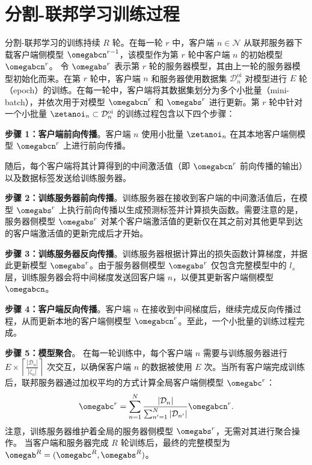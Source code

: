 \section{分割-联邦学习训练过程}\label{subsec:training}
分割-联邦学习的训练持续 $R$ 轮。在每一轮 $r$ 中，客户端 $n \in \mathcal{N}$ 从联邦服务器下载客户端侧模型 $\omegabcn^{r-1}$，该模型作为第 $r$ 轮中客户端 $n$ 的初始模型 $\omegabcn^{r}$。  
令 $\omegabs^{r}$ 表示第 $r$ 轮的服务器模型，其由上一轮的服务器模型初始化而来。在第 $r$ 轮中，客户端 $n$ 和服务器使用数据集 $\mathcal{D}_{n}^{\text{oi}}$ 对模型进行 $E$ 轮（epoch）的训练。在每一轮中，客户端将其数据集划分为多个小批量（mini-batch），并依次用于对模型 $\omegabcn^{r}$ 和 $\omegabs^r$ 进行更新。第 $r$ 轮中针对一个小批量 $\zetanoi_n \subset \mathcal{D}_{n}^{\text{oi}}$ 的训练过程包含以下四个步骤：

\textbf{步骤 1：客户端前向传播}。客户端 $n$ 使用小批量 $\zetanoi_n$ 在其本地客户端侧模型 $\omegabcn^{r}$ 上进行前向传播。

随后，每个客户端将其计算得到的中间激活值（即 $\omegabcn^{r}$ 前向传播的输出）以及数据标签发送给训练服务器。

\textbf{步骤 2：训练服务器前向传播}。训练服务器在接收到客户端的中间激活值后，在模型 $\omegabs^{r}$ 上执行前向传播以生成预测标签并计算损失函数。需要注意的是，服务器侧模型 $\omegabs^{r}$ 对某个客户端激活值的更新仅在其之前对其他更早到达的客户端激活值的更新完成后才开始。

\textbf{步骤 3：训练服务器反向传播}。训练服务器根据计算出的损失函数计算梯度，并据此更新模型 $\omegabs^{r}$。由于服务器侧模型 $\omegabs^{r}$ 仅包含完整模型中的 $l_s$ 层，训练服务器会将中间梯度发送回客户端 $n$，以便其更新客户端侧模型 $\omegabcn$。

\textbf{步骤 4：客户端反向传播}。客户端 $n$ 在接收到中间梯度后，继续完成反向传播过程，从而更新本地的客户端侧模型 $\omegabcn^r$。至此，一个小批量的训练过程完成。

\textbf{步骤 5：模型聚合}。  
在每一轮训练中，每个客户端 $n$ 需要与训练服务器进行 $E \times \left\lceil \frac{|\mathcal{D}_n|}{|\zeta_n|} \right\rceil$ 次交互，以确保客户端 $n$ 的数据被使用 $E$ 次。当所有客户端完成训练后，联邦服务器通过加权平均的方式计算全局客户端侧模型 $\omegabc^r$：
\begin{equation}\label{eq:c-agg}
\omegabc^r=\sum_{n=1}^{N}\frac{|\mathcal{D}_n|}{\sum_{n'=1}^{N}|\mathcal{D}_{n'}|}\omegabcn^r.
\end{equation}
注意，训练服务器维护着全局的服务器侧模型 $\omegabs^r$，无需对其进行聚合操作。  
当客户端和服务器完成 $R$ 轮训练后，最终的完整模型为 $\omegab^R=(\omegabc^R,\omegabs^R)$。

